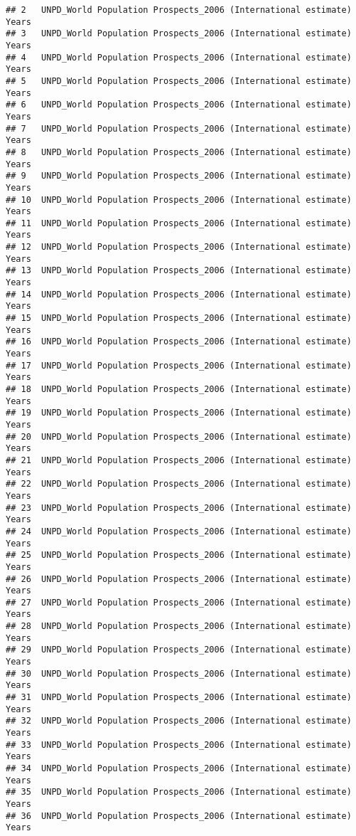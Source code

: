 \documentclass[]{article}
\begin{document}
\begin{verbatim}
## 2   UNPD_World Population Prospects_2006 (International estimate) Years
## 3   UNPD_World Population Prospects_2006 (International estimate) Years
## 4   UNPD_World Population Prospects_2006 (International estimate) Years
## 5   UNPD_World Population Prospects_2006 (International estimate) Years
## 6   UNPD_World Population Prospects_2006 (International estimate) Years
## 7   UNPD_World Population Prospects_2006 (International estimate) Years
## 8   UNPD_World Population Prospects_2006 (International estimate) Years
## 9   UNPD_World Population Prospects_2006 (International estimate) Years
## 10  UNPD_World Population Prospects_2006 (International estimate) Years
## 11  UNPD_World Population Prospects_2006 (International estimate) Years
## 12  UNPD_World Population Prospects_2006 (International estimate) Years
## 13  UNPD_World Population Prospects_2006 (International estimate) Years
## 14  UNPD_World Population Prospects_2006 (International estimate) Years
## 15  UNPD_World Population Prospects_2006 (International estimate) Years
## 16  UNPD_World Population Prospects_2006 (International estimate) Years
## 17  UNPD_World Population Prospects_2006 (International estimate) Years
## 18  UNPD_World Population Prospects_2006 (International estimate) Years
## 19  UNPD_World Population Prospects_2006 (International estimate) Years
## 20  UNPD_World Population Prospects_2006 (International estimate) Years
## 21  UNPD_World Population Prospects_2006 (International estimate) Years
## 22  UNPD_World Population Prospects_2006 (International estimate) Years
## 23  UNPD_World Population Prospects_2006 (International estimate) Years
## 24  UNPD_World Population Prospects_2006 (International estimate) Years
## 25  UNPD_World Population Prospects_2006 (International estimate) Years
## 26  UNPD_World Population Prospects_2006 (International estimate) Years
## 27  UNPD_World Population Prospects_2006 (International estimate) Years
## 28  UNPD_World Population Prospects_2006 (International estimate) Years
## 29  UNPD_World Population Prospects_2006 (International estimate) Years
## 30  UNPD_World Population Prospects_2006 (International estimate) Years
## 31  UNPD_World Population Prospects_2006 (International estimate) Years
## 32  UNPD_World Population Prospects_2006 (International estimate) Years
## 33  UNPD_World Population Prospects_2006 (International estimate) Years
## 34  UNPD_World Population Prospects_2006 (International estimate) Years
## 35  UNPD_World Population Prospects_2006 (International estimate) Years
## 36  UNPD_World Population Prospects_2006 (International estimate) Years

\end{verbatim}
\end{document}
